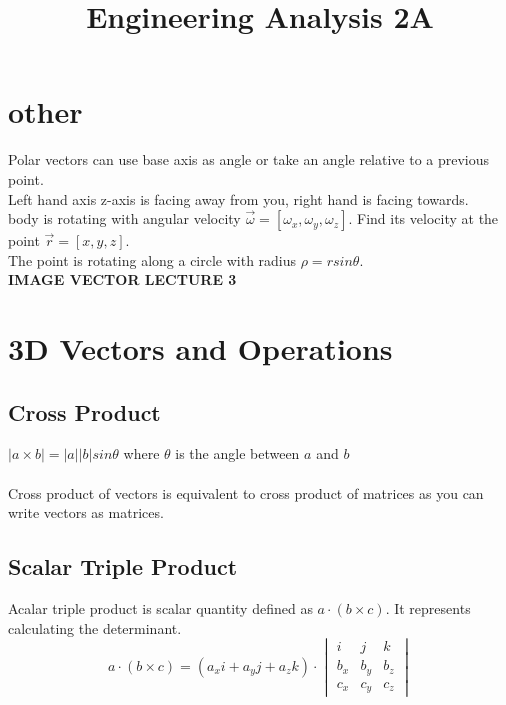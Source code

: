 \documentclass[12pt,a4paper]{article}
\newcommand{\abs}[1]{\lvert#1\rvert}
\begin{document}
\title{Engineering Analysis 2A}
\date{}
\maketitle

\newpage

\tableofcontents

\newpage

\section{other}
    Polar vectors can use base axis as angle or take an angle relative to a previous point. \\
    Left hand axis z-axis is facing away from you, right hand is facing towards. \\ 
    body is rotating with angular velocity $\vec{\omega}=[\omega_x,\omega_y,\omega_z]$. Find its velocity at the point $\vec{r}=[x,y,z]$. \\
    The point is rotating along a circle with radius $\rho=rsin\theta$. \\
    \textbf{IMAGE VECTOR LECTURE 3}

\newpage

\section{3D Vectors and Operations}
    \subsection{Cross Product}
        $\abs{a\times b} = \abs{a}\abs{b}sin\theta$ where $\theta$ is the angle between $a$ and $b$ \\
        \\
        Cross product of vectors is equivalent to cross product of matrices as you can write vectors as matrices.

    \subsection{Scalar Triple Product}
        Acalar triple product is scalar quantity defined as $a\cdot(b\times c)$. It represents calculating the determinant.
        \[
            a\cdot(b\times c)=(a_xi+a_yj+a_zk)\cdot\begin{vmatrix}
            i&j&k \\
            b_x&b_y&b_z \\
            c_x&c_y&c_z
        \end{vmatrix}
        \]
\end{document}
